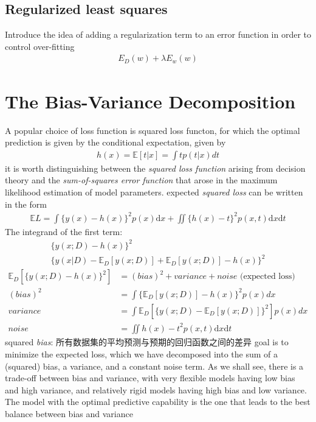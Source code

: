 \documentclass[a4paper]{article}
\begin{document}
\subsection{Regularized least squares}
\label{sec:3.1.4}

Introduce the idea of adding a regularization term to an error function in order to control over-fitting
\begin{align}
  E_D(w) + \lambda E_w(w)
\end{align}

\section{The Bias-Variance Decomposition}
\label{sec:3.2}

A popular choice of loss function is squared loss functon, for which the optimal prediction is given by the conditional expectation, given by
\begin{align}
  h(x) = \mathbb{E}[t|x] = \int t p(t|x) dt
\end{align}
it is worth distinguishing between the \textit{squared loss function} arising from decision theory and the \textit{sum-of-squares error function} that arose in the maximum likelihood estimation of model parameters.
expected \emph{squared loss} can be written in the form
\begin{align}
  \mathbb{E}{L} = \int \{y(x) - h(x)\}^2 p(x) \mathrm{d}x + \iint \{h(x) -t\}^2 p(x,t)\mathrm{d}x \mathrm{d}t
\end{align}
The integrand of the first term:
\begin{align}
  \{y(x;D) - h(x)\}^2\\
  \{y(x|D) - \mathbb{E}_D[y(x;D)] + \mathbb{E}_D[y(x;D)] - h(x)\}^2
\end{align}
\begin{align*}
\mathbb{E}_D[ \{y(x;D) - h(x)\}^2 ] &= (bias)^2 + variance + noise \text{ (expected loss)}\\
(bias)^2 &= \int \{ \mathbb{E}_D[y(x;D)] - h(x) \}^2 p(x) dx\\
variance &= \int \mathbb{E}_D[\{ y(x;D) - \mathbb{E}_D[y(x;D)] \}^2 ] p(x) dx\\
noise &= \iint {h(x) - t}^2 p(x,t) \mathrm{d}x \mathrm{d}t
\end{align*}
squared \textit{bias}: 所有数据集的平均预测与预期的回归函数之间的差异
goal is to minimize the expected loss, which we have decomposed into the sum of a (squared) bias, a variance, and a constant noise term.
As we shall see, there is a trade-off between bias and variance, with very flexible models having low bias and high variance, and relatively rigid models having high bias and low variance.
The model with the optimal predictive capability is the one that leads to the best balance between bias and variance
\end{document}
